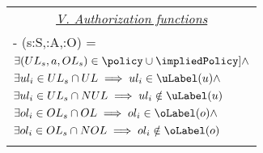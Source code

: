 \begin{table}
\begin{tabular}{|l|}
		\multicolumn{1}{|c|}{\underline{\textit{V. Authorization functions}}} \\
		- \request(s:S,\amem:A,\objmem:O) =	\\ \hfill  $\exists (UL_s, a, OL_s) \in \policy \cup \impliedPolicy ] \land $   \\
		 \hfill   $\exists ul_i \in UL_s \cap UL \implies  ul_i \in \uLabel(u) \land$ \\
		 \hfill $\exists  ul_i \in UL_s \cap NUL \implies  ul_i \notin \uLabel(u)$ \\
		 \hfill   $\exists ol_i \in OL_s \cap OL \implies  ol_i \in \oLabel(o) \land$ \\
		 \hfill $\exists  ol_i \in OL_s \cap NOL \implies  ol_i \notin \oLabel(o)$ \\

		\\ \hline	
	\end{tabular}
	
\end{table}

